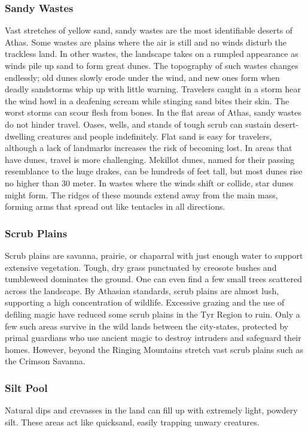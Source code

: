 \begin{multicols}{2}
\subsubsection{Sandy Wastes}

Vast stretches of yellow sand, sandy wastes are the most identifiable deserts
of Athas. Some wastes are plains where the air is still and no winds disturb
the trackless land. In other wastes, the landscape takes on a rumpled appearance
as winds pile up sand to form great dunes. The topography of such wastes
changes endlessly; old dunes slowly erode under the wind, and new ones form
when deadly sandstorms whip up with little warning. Travelers caught in a storm
hear the wind howl in a deafening scream while stinging sand bites their skin.
The worst storms can scour flesh from bones. In the flat areas of Athas, sandy
wastes do not hinder travel. Oases, wells, and stands of tough scrub can
sustain desert-dwelling creatures and people indefinitely. Flat sand is easy
for travelers, although a lack of landmarks increases the risk of becoming
lost. In areas that have dunes, travel is more challenging. Mekillot dunes,
named for their passing resemblance to the huge drakes, can be hundreds of feet
tall, but most dunes rise no higher than 30 meter. In wastes where the winds
shift or collide, star dunes might form. The ridges of these mounds extend away
from the main mass, forming arms that spread out like tentacles in all directions.

\subsubsection{Scrub Plains}

Scrub plains are savanna, prairie, or chaparral with just enough water to
support extensive vegetation. Tough, dry grass punctuated by creosote bushes
and tumbleweed dominates the ground. One can even find a few small trees
scattered across the landscape. By Athasian standards, scrub plains are almost
lush, supporting a high concentration of wildlife. Excessive grazing and the
use of defiling magic have reduced some scrub plains in the Tyr Region to ruin.
Only a few such areas survive in the wild lands between the city-states,
protected by primal guardians who use ancient magic to destroy intruders and
safeguard their homes. However, beyond the Ringing Mountains stretch vast
scrub plains such as the Crimson Savanna.

\subsubsection{Silt Pool}
Natural dips and crevasses in the land can fill up with extremely light,
powdery silt. These areas act like quicksand, easily trapping unwary creatures.


\end{multicols}
